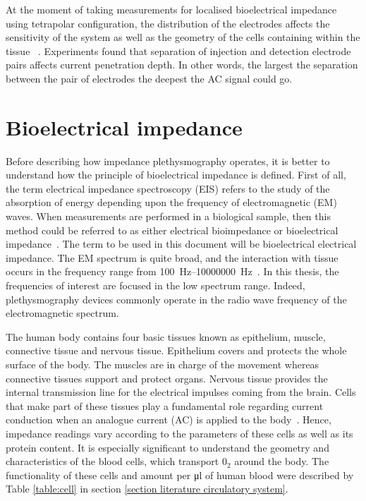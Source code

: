 At the moment of taking measurements for localised bioelectrical impedance using tetrapolar configuration, the distribution of the electrodes affects the sensitivity of the system as well as the geometry of the cells containing within the tissue ~\cite{bertemes2002tissue}. Experiments found that separation of injection and detection electrode pairs affects current penetration depth. In other words, the largest the separation between the pair of electrodes the deepest the AC signal could go.


\section{Bioelectrical impedance}
\label{section impedance BI}
Before describing how impedance plethysmography operates, it is better to understand how the principle of bioelectrical impedance is defined. First of all, the term electrical impedance spectroscopy (EIS) refers to the study of the absorption of energy depending upon the frequency of electromagnetic (EM) waves. When measurements are performed in a biological sample, then this method could be referred to as either electrical bioimpedance or bioelectrical impedance~\cite{ivorra2003bioimpedance}. The term to be used in this document will be bioelectrical electrical impedance. The EM spectrum is quite broad, and the interaction with tissue occurs in the frequency range from \SIrange[scientific-notation = engineering]{100}{10000000}{\hertz}~\cite{bertemes2002tissue}. In this thesis, the frequencies of interest are focused in the low spectrum range. Indeed, plethysmography devices commonly operate in the radio wave frequency of the electromagnetic spectrum.

The human body contains four basic tissues known as epithelium, muscle, connective tissue and nervous tissue. Epithelium covers and protects the whole surface of the body. The muscles are in charge of the movement whereas connective tissues support and protect organs. Nervous tissue provides the internal transmission line for the electrical impulses coming from the brain. Cells that make part of these tissues play a fundamental role regarding current conduction when an analogue current (AC) is applied to the body~\cite{lvovich2012impedance}. Hence, impedance readings vary according to the parameters of these cells as well as its protein content. It is especially significant to understand the geometry and characteristics of the blood cells, which transport $0_2$ around the body. The functionality of these cells and amount per \si{\micro\litre} of human blood were described by Table \ref{table:cell} in section \ref{section literature circulatory system}.

